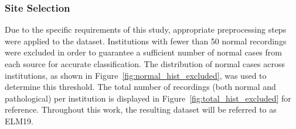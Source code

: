 \documentclass{bachelor2025eng}
\begin{document}
        \subsubsection{Site Selection}
        Due to the specific requirements of this study, appropriate preprocessing steps were applied to the dataset. Institutions with fewer than 50 normal recordings were excluded in order to guarantee a sufficient number of normal cases from each source for accurate classification. The distribution of normal cases across institutions, as shown in Figure~\ref{fig:normal_hist_excluded}, was used to determine this threshold. The total number of recordings (both normal and pathological) per institution is displayed in Figure~\ref{fig:total_hist_excluded} for reference. Throughout this work, the resulting dataset will be referred to as ELM19.
\end{document}
